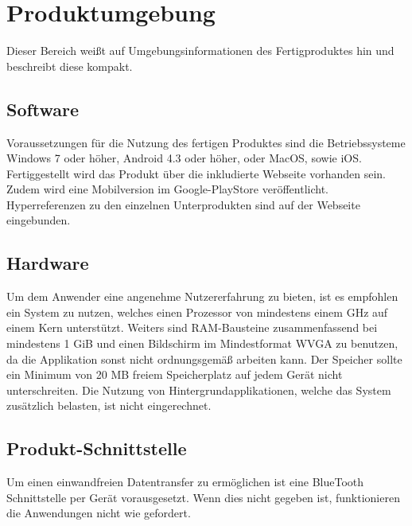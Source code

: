 \section{Produktumgebung}
Dieser Bereich weißt auf Umgebungsinformationen des Fertigproduktes hin und beschreibt diese kompakt.
\subsection{Software}
Voraussetzungen für die Nutzung des fertigen Produktes sind die Betriebssysteme Windows 7 oder höher, Android 4.3 oder höher, oder MacOS, sowie iOS. Fertiggestellt wird das Produkt über die inkludierte Webseite vorhanden sein. Zudem wird eine Mobilversion im Google-PlayStore veröffentlicht. Hyperreferenzen zu den einzelnen Unterprodukten sind auf der Webseite eingebunden.
\subsection{Hardware}
Um dem Anwender eine angenehme Nutzererfahrung zu bieten, ist es empfohlen ein System zu nutzen, welches einen Prozessor von mindestens einem GHz auf einem Kern unterstützt. Weiters sind RAM-Bausteine zusammenfassend bei mindestens 1 GiB und einen Bildschirm im Mindestformat WVGA zu benutzen, da die Applikation sonst nicht ordnungsgemäß arbeiten kann. Der Speicher sollte ein Minimum von 20 MB freiem Speicherplatz auf jedem Gerät nicht unterschreiten. Die Nutzung von Hintergrundapplikationen, welche das System zusätzlich belasten, ist nicht eingerechnet.
\subsection{Produkt-Schnittstelle}
Um einen einwandfreien Datentransfer zu ermöglichen ist eine BlueTooth Schnittstelle per Gerät vorausgesetzt. Wenn dies nicht gegeben ist, funktionieren die Anwendungen nicht wie gefordert.
